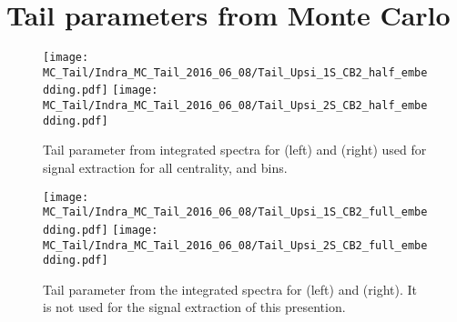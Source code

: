 \section{Tail parameters from Monte Carlo}
  
\begin{figure}[!h]
  \texttt{[image: MC\_Tail/Indra\_MC\_Tail\_2016\_06\_08/Tail\_Upsi\_1S\_CB2\_half\_embedding.pdf]}
  \texttt{[image: MC\_Tail/Indra\_MC\_Tail\_2016\_06\_08/Tail\_Upsi\_2S\_CB2\_half\_embedding.pdf]}
  \caption{\scriptsize Tail parameter from integrated spectra for \ups (left) and \upsp (right) used for signal extraction for all centrality, \pt and \y bins. }
\end{figure}       

\begin{figure}[!h]
  \texttt{[image: MC\_Tail/Indra\_MC\_Tail\_2016\_06\_08/Tail\_Upsi\_1S\_CB2\_full\_embedding.pdf]}
  \texttt{[image: MC\_Tail/Indra\_MC\_Tail\_2016\_06\_08/Tail\_Upsi\_2S\_CB2\_full\_embedding.pdf]}
  \caption{\scriptsize Tail parameter from the integrated spectra for \ups (left) and \upsp (right). It is not used for the signal extraction of this presention.}
\end{figure}       
